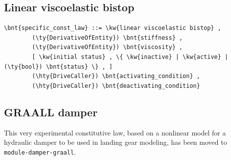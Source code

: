 \subsection{Linear viscoelastic bistop}
\begin{Verbatim}[commandchars=\\\{\}]
    \bnt{specific_const_law} ::= \kw{linear viscoelastic bistop} ,
        (\ty{DerivativeOfEntity}) \bnt{stiffness} ,
        (\ty{DerivativeOfEntity}) \bnt{viscosity} ,
        [ \kw{initial status} , \{ \kw{inactive} | \kw{active} | (\ty{bool}) \bnt{status} \} , ]
        (\hty{DriveCaller}) \bnt{activating_condition} ,
        (\hty{DriveCaller}) \bnt{deactivating_condition}
\end{Verbatim}
  
\subsection{GRAALL damper}
This very experimental constitutive law, based on a nonlinear model
for a hydraulic damper to be used in landing gear modeling,
has been moved to \texttt{module-damper-graall}.

